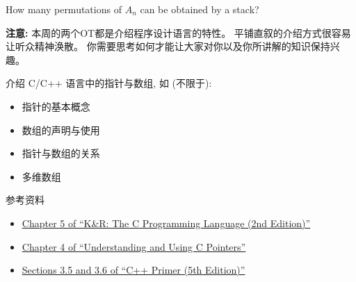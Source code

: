\documentclass[a4paper, justified]{tufte-handout}
\begin{document}
\beginoptional

\begin{problem}
How many permutations of $A_n$ can be obtained by a stack?
\end{problem}

\begin{solution}
\end{solution}

\beginot

{\bf 注意:} 本周的两个OT都是介绍程序设计语言的特性。
平铺直叙的介绍方式很容易让听众精神涣散。
你需要思考如何才能让大家对你以及你所讲解的知识保持兴趣。

\begin{ot}
  介绍 C/C++ 语言中的指针与数组, 如 (不限于):
  \begin{itemize}
    \item 指针的基本概念
    \item 数组的声明与使用
    \item 指针与数组的关系
    \item 多维数组
  \end{itemize}

  \noindent 参考资料
  \begin{itemize}
    \item \href{http://cslabcms.nju.edu.cn/problem\_solving/images/c/cc/The\_C\_Programming\_Language\_\%282nd\_Edition\_Ritchie\_Kernighan\%29.pdf}{Chapter 5 of ``K\&R: The C Programming Language (2nd Edition)''}
    \item \href{http://cslabcms.nju.edu.cn/problem\_solving/images/5/53/Understanding\_and\_Using\_C\_Pointers\_\%28Richard\_Reese\%29.pdf}{Chapter 4 of ``Understanding and Using C Pointers''}
    \item \href{http://ptgmedia.pearsoncmg.com/images/9780321714114/samplepages/0321714113.pdf}{Sections 3.5 and 3.6 of ``C++ Primer (5th Edition)''}
  \end{itemize}
\end{ot}
\end{document}
